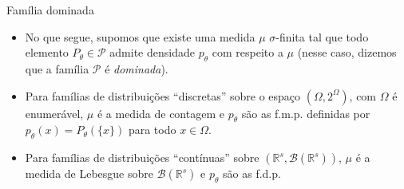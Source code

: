 \documentclass[11pt]{beamer}
\newenvironment{halfwideitemize}{\itemize\addtolength{\itemsep}{0.5em}}{\enditemize}
\begin{document}
	\begin{frame}{Família dominada}
		\begin{itemize}
			\item No que segue, supomos que existe uma medida $\mu$ $\sigma$-finita tal que todo elemento $P_\theta \in \mathcal{P}$ admite densidade $p_\theta$ com respeito a $\mathcal{\mu}$ (nesse caso, dizemos que a família $\mathcal{P}$ é \emph{dominada}).
			\begin{halfwideitemize}
				\item Para famílias de distribuições ``discretas'' sobre o espaço $(\Omega,2^\Omega)$, com $\Omega$ é enumerável, $\mu$ é a medida de contagem e $p_\theta$ são as f.m.p. definidas por $p_{\theta}(x) = P_{\theta}(\{x\})$ para todo $x \in \Omega$.
				\item Para famílias de distribuições ``contínuas'' sobre $(\mathbb{R}^s, \mathcal{B}(\mathbb{R}^s))$, $\mathcal{\mu}$ é a medida de Lebesgue sobre $\mathcal{B}(\mathbb{R}^s)$ e $p_\theta$ são as f.d.p.
			\end{halfwideitemize}

	
			\end{itemize}
	\end{frame}
\end{document}
